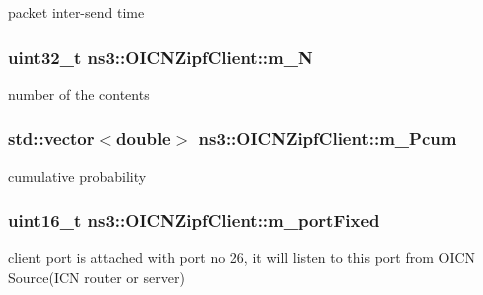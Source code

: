 packet inter-\/send time 

\hypertarget{classns3_1_1OICNZipfClient_a4146b87daf72c43e4d9f1e288897e30e}{
\subsubsection[{m\-\_\-\-N}]{\setlength{\rightskip}{0pt plus 5cm}uint32\-\_\-t ns3\-::\-O\-I\-C\-N\-Zipf\-Client\-::m\-\_\-\-N\hspace{0.3cm}{\ttfamily [private]}}}\label{classns3_1_1OICNZipfClient_a4146b87daf72c43e4d9f1e288897e30e}


number of the contents 

\hypertarget{classns3_1_1OICNZipfClient_a1dd636e731bbe2b2273970c3e9c191b7}{
\subsubsection[{m\-\_\-\-Pcum}]{\setlength{\rightskip}{0pt plus 5cm}std\-::vector$<$double$>$ ns3\-::\-O\-I\-C\-N\-Zipf\-Client\-::m\-\_\-\-Pcum\hspace{0.3cm}{\ttfamily [private]}}}\label{classns3_1_1OICNZipfClient_a1dd636e731bbe2b2273970c3e9c191b7}


cumulative probability 

\hypertarget{classns3_1_1OICNZipfClient_a9f6a96310cf93dd8233c3f8c7c9bf298}{
\subsubsection[{m\-\_\-port\-Fixed}]{\setlength{\rightskip}{0pt plus 5cm}uint16\-\_\-t ns3\-::\-O\-I\-C\-N\-Zipf\-Client\-::m\-\_\-port\-Fixed\hspace{0.3cm}{\ttfamily [private]}}}\label{classns3_1_1OICNZipfClient_a9f6a96310cf93dd8233c3f8c7c9bf298}


client port is attached with port no 26, it will listen to this port from O\-I\-C\-N Source(\-I\-C\-N router or server) 

